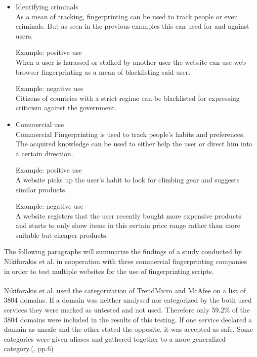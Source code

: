 \begin{itemize}
	\item Identifying criminals\\
	As a mean of tracking, fingerprinting can be used to track people or even criminals. But as seen in the previous examples this can used for and against users. 
	\begin{tcolorbox}
	Example: positive use\\
	When a user is harassed or stalked by another user the website can use web browser fingerprinting as a mean of blacklisting said user. 
	\end{tcolorbox}
	\begin{tcolorbox}
	Example: negative use\\
	Citizens of countries with a strict regime can be blacklisted for expressing criticism against the government.
	\end{tcolorbox}
	\item Commercial use\\
	Commercial Fingerprinting is used to track people’s habits and preferences. The acquired knowledge can be used to either help the user or direct him into a certain direction. 
	\begin{tcolorbox}
	Example: positive use\\
	A website picks up the user’s habit to look for climbing gear and suggests similar products.
	\end{tcolorbox}
	\begin{tcolorbox}
	Example: negative use\\
	A website registers that the user recently bought more expensive products and starts to only show items in this certain price range rather than more suitable but cheaper products.
	\end{tcolorbox}
\end{itemize}
The following paragraphs will summarize the findings of a study conducted by Nikiforakis et al. in cooperation with three commercial fingerprinting companies in order to test multiple websites for the use of fingerprinting scripts.\\\\
Nikiforakis et al. used the categorization of TrendMicro and McAfee on a list of 3804 domains. If a domain was neither analysed nor categorized by the both used services they were marked as untested and not used. Therefore only 59.2\% of the 3804 domains were included in the results of this testing. If one service declared a domain as unsafe and the other stated the opposite, it was accepted as safe. Some categories were given aliases and gathered together to a more generalized category.(\textcite{nikiforakis13}, pp.6)\\\\
